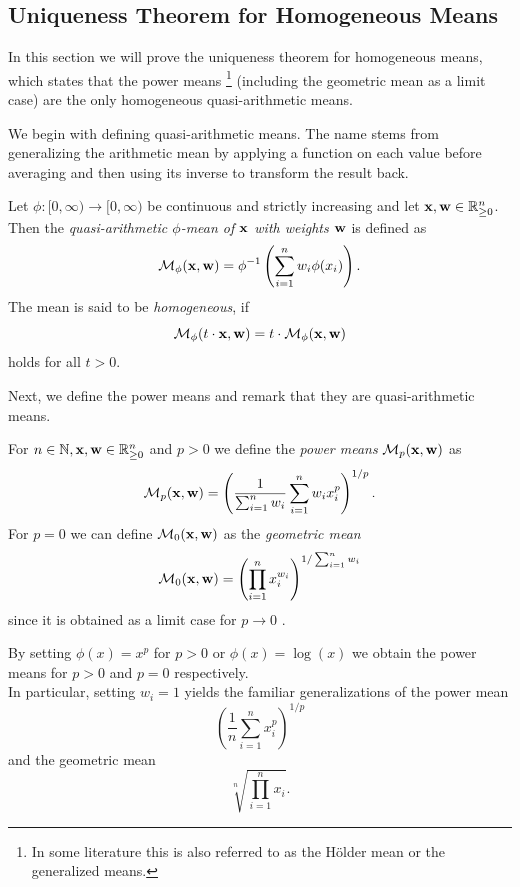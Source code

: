\subsection{Uniqueness Theorem for Homogeneous Means} \label{sect-HLP_proof}
In this section we will prove the uniqueness theorem for homogeneous means, which states that the power means \footnote{In some literature this is also referred to as the Hölder mean or the generalized means.} (including the geometric mean as a limit case) are the only homogeneous quasi-arithmetic means.

We begin with defining quasi-arithmetic means. The name stems from generalizing the arithmetic mean by applying a function on each value before averaging and then using its inverse to transform the result back.

\begin{defi}   %
	Let $\phi : [0,\infty) \rightarrow [0,\infty)$ be continuous and strictly increasing and let $\ve{x}, \ve{w} \in \mathbb{R}_{\geq 0}^n$.
	Then the \emph{quasi-arithmetic $\phi$-mean of $\ve{x}$ with weights $\ve{w}$} is defined as 
	$$\mean{\ve{x}} = \phi^{-1} \left ( \sum_{i=1}^{n} w_i \phi(x_i) \right).$$
	The mean is said to be \emph{homogeneous}, if
	$$\mean{t \cdot \ve{x}} = t \cdot \mean{\ve{x}}$$
	holds for all $t > 0$.
\end{defi}

Next, we define the power means and remark that they are quasi-arithmetic means.

\begin{defi}  %
	For $n \in \mathbb{N}, \ve{x}, \ve{w} \in \mathbb{R}_{\geq 0}^n$ and $ p > 0$ we define the \emph{power means} $\meanp{\ve{x}}$ as
	$$ \meanp{\ve{x}} = \left ( \frac{1}{\sum_{i=1}^{n} w_i} \sum_{i=1}^{n}w_i x_i^p \right)^{1/p}. $$
	For $p=0$ we can define $\meanp[0]{\ve{x}}$ as the \emph{geometric mean}
	$$
\meanp[0]{\ve{x}} = \left ( \prod_{i=1}^n x_i^{w_i} \right )^{1 / \sum_{i=1}^{n}w_i}
	$$
	since it is obtained as a limit case for $p \rightarrow 0$ \parencite[p. 176]{handbookMeans}.
\end{defi}

\begin{rem}
	By setting $\phi(x) = x^p$ for $p>0$ or $\phi(x) = \log(x)$ we obtain the power means for $p>0$ and $p=0$ respectively.\\
  In particular, setting $w_i = 1$ yields the familiar generalizations of the power mean
	$$\left ( \frac{1}{n} \sum_{i=1}^{n}x_i^p \right)^{1/p} $$
  and the geometric mean
  $$\sqrt[n]{\prod_{i=1}^n x_i} .$$
\end{rem}


